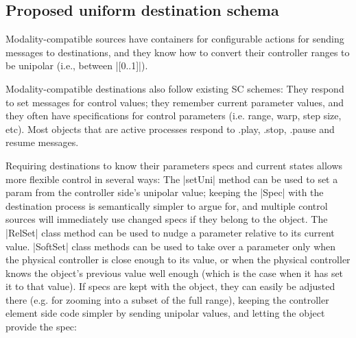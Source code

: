 \documentclass{article}
\newcommand{\todo}[1] {\emph{\textbf{TODO:} #1}}
\begin{document}
\subsection{Proposed uniform destination schema}

% 

Modality-compatible sources have containers for configurable actions for sending messages to destinations, and they know how to convert their controller ranges to be unipolar (i.e., between |[0..1]|).

Modality-compatible destinations also follow existing SC schemes: They respond to set messages for control values; they remember current parameter values, and they often have specifications for control parameters (i.e. range, warp, step size, etc). Most objects that are active processes respond to .play, .stop, .pause and resume messages. 

Requiring destinations to know their parameters specs and current states allows more flexible control in several ways: 
The |setUni| method can be used to set a param from the controller side's unipolar value; keeping the |Spec| with the destination process is semantically simpler to argue for, and multiple control sources will immediately use changed specs if they belong to the object. 
The |RelSet| class method can be used to nudge a parameter relative to its current value. 
|SoftSet| class methods can be used to take over a parameter only when the physical controller is close enough to its value, or when the physical controller knows the object's previous value well enough (which is the case when it has set it to that value). 
If specs are kept with the object, they can easily be adjusted there (e.g. for zooming into a subset of the full range), keeping the controller element side code simpler by sending unipolar values, and letting the object provide the spec:
\end{document}
